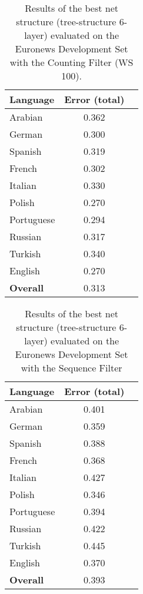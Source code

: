 \begin{table}[!htbp]
\centering
\caption{Results of the best net structure (tree-structure 6-layer) evaluated on the Euronews Development Set with the Counting Filter (WS 100).}
\label{tab:gauss}
\begin{tabular}{| l | c | r | }
	\hline
	\textbf{Language} & \textbf{Error (total) }  \\
	\hline
	Arabian & 0.362  \\
	German & 0.300  \\
	Spanish & 0.319 \\ 
	French & 0.302 \\
	Italian & 0.330  \\
	Polish & 0.270 \\
	Portuguese& 0.294 \\
	Russian&  0.317 \\
	Turkish&  0.340 \\
	English&  0.270 \\
	\hline
	\textbf{Overall} & 0.313 \\
	\hline
\end{tabular}
\end{table}

\begin{table}[!htbp]
\centering
\caption{Results of the best net structure (tree-structure 6-layer) evaluated on the Euronews Development Set with the Sequence Filter}
\label{tab:sequence}
\begin{tabular}{| l | c | r | }
	\hline
	\textbf{Language} & \textbf{Error (total) }  \\
	\hline
	Arabian & 0.401  \\
	German & 0.359  \\
	Spanish & 0.388 \\ 
	French & 0.368 \\
	Italian & 0.427  \\
	Polish & 0.346 \\
	Portuguese& 0.394 \\
	Russian&  0.422 \\
	Turkish&  0.445 \\
	English&  0.370 \\
	\hline
	\textbf{Overall} & 0.393 \\
	\hline
\end{tabular}
\end{table}


